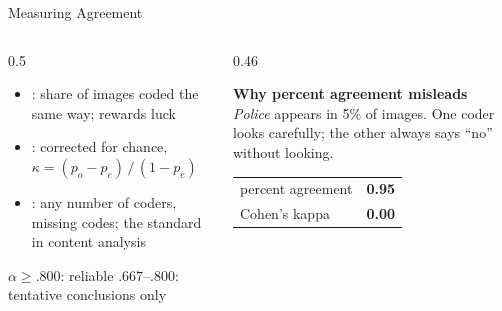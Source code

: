 \begin{frame}{Measuring Agreement}
\begin{columns}[T]
\begin{column}{0.5\textwidth}
\begin{itemize}
\item {}: share of images coded the same way; rewards luck
\item {}: corrected for chance,
      $\kappa = (p_o - p_e)\,/\,(1 - p_e)$
\item {}: any number of coders, missing codes; the standard in
      content analysis
\end{itemize}
\begin{graybox}
$\alpha \geq .800$: reliable \quad $.667$--$.800$: tentative conclusions only
\end{graybox}
\end{column}
\begin{column}{0.46\textwidth}
\vspace{0.3cm}
\begin{warnbox}
\textbf{Why percent agreement misleads}\\
\emph{Police} appears in 5\% of images. One coder looks carefully; the other always says ``no''
without looking.\\[4pt]
\begin{tabular}{@{}lr@{}}
percent agreement & \textbf{0.95} \\
Cohen's kappa & \textbf{0.00} \\
\end{tabular}
\end{warnbox}
\end{column}
\end{columns}
\end{frame}

